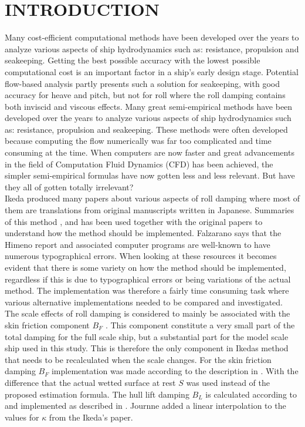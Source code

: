 \section*{INTRODUCTION}\label{sec:introduction}
Many cost-efficient computational methods have been developed over the years to analyze various aspects of ship hydrodynamics such as:
resistance, propulsion and seakeeping. Getting the best possible
accuracy with the lowest possible computational cost is an important factor in a ship's early design stage. Potential flow-based analysis partly presents such a solution for seakeeping, with good accuracy for heave and pitch, but not for roll where the roll damping contains both inviscid and viscous effects. 
Many great semi-empirical methods have been developed over the years to analyze various aspects of ship hydrodynamics such as: resistance, propulsion and seakeeping. These methods were often developed because computing the flow numerically was far too complicated and time consuming at the time. When computers are now faster and great advancements in the field of Computation Fluid Dynamics (CFD) has been achieved, the simpler semi-empirical formulas have now gotten less and less relevant. But have they all of gotten totally irrelevant?\\


Ikeda produced many papers about various aspects of roll damping where most of them are translations from original manuscripts written in Japanese. Summaries of this method \cite{7505983/FB64RGPF}, \cite{7505983/KAKIM2E2} and \cite{7505983/UGK6YEVD} has been used
together with the original papers to understand how the method should be implemented. Falzarano says that the Himeno report and associated
computer programs are well-known to have numerous typographical errors. When looking at these resources it becomes evident that there is some variety on how the method should be implemented, regardless if this is due to typographical errors or being variations of the actual method. The implementation was therefore a fairly time consuming task where various alternative implementations needed to be compared and investigated.\\

The scale effects of roll damping is considered to mainly be associated with the skin friction component $B_F$ \cite{7505983/FB64RGPF}. This component constitute a very small part of the total damping for the full scale ship, but a substantial part for the model scale ship used in this study. This is therefore the only component in Ikedas method that needs to be recalculated when the scale changes.
For the skin friction damping $B_F$ implementation was made according to the description in \cite{7505983/UGK6YEVD}. With the difference that the actual wetted surface at rest $S$ was used instead of the proposed estimation formula.
The hull lift damping $B_L$ is calculated according to\cite{7505983/937PN5DT} and implemented as described in \cite{7505983/UYUAYY7E}. Journne added a linear interpolation to the values for $\kappa$ from the Ikeda's paper.\\

